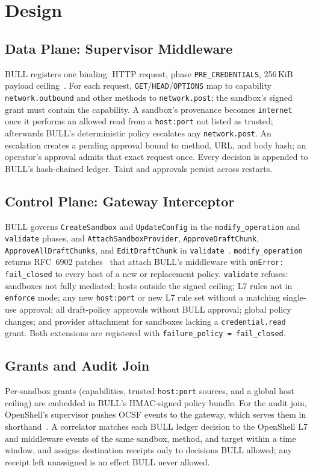 \documentclass[journal]{IEEEtran}
\newcommand{\bull}{\textsc{BULL}}
\newcommand{\openshell}{OpenShell}
\begin{document}
\section{Design}
\subsection{Data Plane: Supervisor Middleware}
\bull{} registers one binding: HTTP request, phase \texttt{PRE\_CREDENTIALS}, 256\,KiB payload ceiling~\cite{OS_MiddlewareProto}. For each request, \texttt{GET}/\texttt{HEAD}/\texttt{OPTIONS} map to capability \texttt{network.outbound} and other methods to \texttt{network.post}; the sandbox's signed grant must contain the capability. A sandbox's provenance becomes \texttt{internet} once it performs an allowed read from a \texttt{host:port} not listed as trusted; afterwards \bull{}'s deterministic policy escalates any \texttt{network.post}. An escalation creates a pending approval bound to method, URL, and body hash; an operator's approval admits that exact request once. Every decision is appended to \bull{}'s hash-chained ledger. Taint and approvals persist across restarts.

\subsection{Control Plane: Gateway Interceptor}
\bull{} governs \texttt{CreateSandbox} and \texttt{UpdateConfig} in the \texttt{modify\_operation} and \texttt{validate} phases, and \texttt{AttachSandboxProvider}, \texttt{ApproveDraftChunk}, \texttt{ApproveAllDraftChunks}, and \texttt{EditDraftChunk} in \texttt{validate}~\cite{OS_InterceptorProto}. \texttt{modify\_operation} returns RFC~6902 patches~\cite{RFC6902} that attach \bull{}'s middleware with \texttt{onError: fail\_closed} to every host of a new or replacement policy. \texttt{validate} refuses: sandboxes not fully mediated; hosts outside the signed ceiling; L7 rules not in \texttt{enforce} mode; any new \texttt{host:port} or new L7 rule set without a matching single-use approval; all draft-policy approvals without \bull{} approval; global policy changes; and provider attachment for sandboxes lacking a \texttt{credential.read} grant. Both extensions are registered with \texttt{failure\_policy = fail\_closed}.

\subsection{Grants and Audit Join}
Per-sandbox grants (capabilities, trusted \texttt{host:port} sources, and a global host ceiling) are embedded in \bull{}'s HMAC-signed policy bundle. For the audit join, \openshell{}'s supervisor pushes OCSF events to the gateway, which serves them in shorthand~\cite{OS_Logging}. A correlator matches each \bull{} ledger decision to the \openshell{} L7 and middleware events of the same sandbox, method, and target within a time window, and assigns destination receipts only to decisions \bull{} allowed; any receipt left unassigned is an effect \bull{} never allowed.
\end{document}
